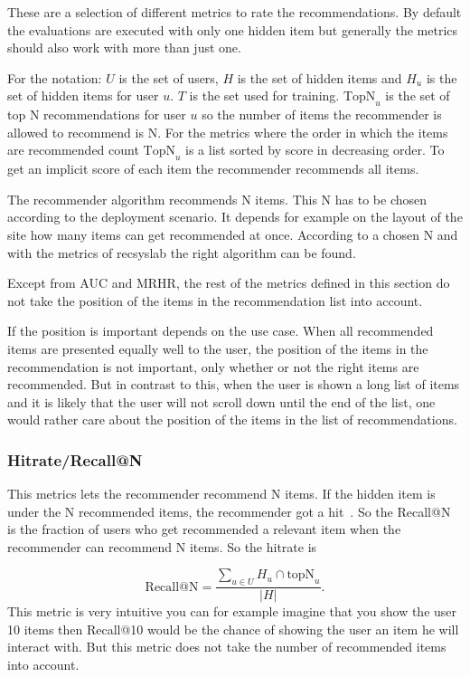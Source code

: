 These are a selection of different metrics to rate the recommendations.
By default the evaluations are executed with only one hidden item
but generally the metrics should also work with more than just one.

For the notation: $U$ is the set of users, $H$ is the set of hidden items
and \(H_u\) is the set of hidden items for user $u$. $T$ is the set used for 
training. \(\text{TopN}_u\)
is the set of top N recommendations for user $u$ so the number of items
the recommender is allowed to recommend is N. For the metrics where
the order in which the items are recommended count \(\text{TopN}_u\)
is a list sorted by score in decreasing order.
To get an implicit score of each item the recommender recommends all
items.

The recommender algorithm recommends N items. This N has to be chosen
according to the deployment scenario. It depends for example 
on the layout of the site how many items can get recommended at
once. According to a chosen N and with the metrics of recsyslab the right
algorithm can be found. 

Except from AUC and MRHR, the rest of the metrics defined in this section do not take the position
of the items in the recommendation list into account.

If the position is important depends on the use case.
When all recommended items are presented equally well to the
user, the position of the items in the recommendation
is not important, only whether or not the right items are
recommended. But in contrast to this, when the user is shown 
a long list of items and it is likely that the user will not
scroll down until the end of the list, one would rather care about
the position of the items in the list of recommendations.

\subsubsection{Hitrate/Recall@N}

This metrics lets the recommender recommend N items. If the hidden
item is under the N recommended items, the recommender got a 
hit~\cite{Karypis:2001:EIT:502585.502627, Sarwar00applicationof}.
So the Recall@N is the fraction of users who get recommended a
relevant item when the recommender can recommend N items.
So the hitrate is 

\begin{equation} 
\text{Recall@N}=\frac{\sum_{u \in U} H_u \cap \text{topN}_u}{|H|}.
\end{equation}
This metric is very intuitive you can for example imagine that you
show the user 10 items then Recall@10 would be the chance of showing
the user an item he will interact with. But this metric does not take
the number of recommended items into account.


